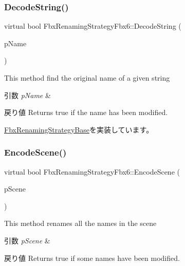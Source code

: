 \subsubsection{\texorpdfstring{Decode\+String()}{DecodeString()}}
{\footnotesize\ttfamily virtual bool Fbx\+Renaming\+Strategy\+Fbx6\+::\+Decode\+String (\begin{DoxyParamCaption}\item[{\hyperlink{class_fbx_name_handler}{Fbx\+Name\+Handler} \&}]{p\+Name }\end{DoxyParamCaption})\hspace{0.3cm}{\ttfamily [virtual]}}

This method find the original name of a given string 
\begin{DoxyParams}{引数}
{\em p\+Name} & \\
\hline
\end{DoxyParams}
\begin{DoxyReturn}{戻り値}
Returns true if the name has been modified. 
\end{DoxyReturn}


\hyperlink{class_fbx_renaming_strategy_base_acc30037744da35fa2b59fdd4ff6d9ede}{Fbx\+Renaming\+Strategy\+Base}を実装しています。

\mbox{\label{class_fbx_renaming_strategy_fbx6_a24a48914e694f5bada3b0604a4dc62bf}} 
\subsubsection{\texorpdfstring{Encode\+Scene()}{EncodeScene()}}
{\footnotesize\ttfamily virtual bool Fbx\+Renaming\+Strategy\+Fbx6\+::\+Encode\+Scene (\begin{DoxyParamCaption}\item[{\hyperlink{class_fbx_scene}{Fbx\+Scene} $\ast$}]{p\+Scene }\end{DoxyParamCaption})\hspace{0.3cm}{\ttfamily [virtual]}}

This method renames all the names in the scene 
\begin{DoxyParams}{引数}
{\em p\+Scene} & \\
\hline
\end{DoxyParams}
\begin{DoxyReturn}{戻り値}
Returns true if some names have been modified. 
\end{DoxyReturn}


